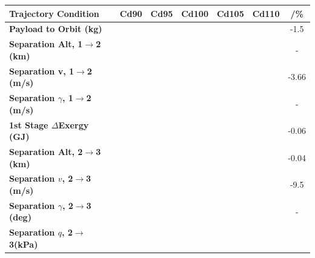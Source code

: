 \begin{table}[ht]
	\centering
\begin{tabular}{l c c c c c c} 
	\hline \textbf{Trajectory Condition}
	&Cd90
	&Cd95
	&Cd100
	&Cd105
	&Cd110
	& /\%
	\\
	\hline \textbf{Payload to Orbit (kg)}
	& \PayloadToOrbitCdNinety
	& \PayloadToOrbitCdNinetyFive
	& \PayloadToOrbitCdStandard
	& \PayloadToOrbitCdOneHundredFive
	& \PayloadToOrbitCdOneHundredTen
	&-1.5
	\\
	\textbf{Separation Alt, 1$\rightarrow$2 (km)}
	& \firstsecondSeparationAltCdNinety
	& \firstsecondSeparationAltCdNinetyFive
	& \firstsecondSeparationAltCdStandard
	& \firstsecondSeparationAltCdOneHundredFive
	& \firstsecondSeparationAltCdOneHundredTen
	& -
	\\
	\textbf{Separation v, 1$\rightarrow$2 (m/s)}
	& \firstsecondSeparationvCdNinety
	& \firstsecondSeparationvCdNinetyFive
	& \firstsecondSeparationvCdStandard
	& \firstsecondSeparationvCdOneHundredFive
	& \firstsecondSeparationvCdOneHundredTen
	&-3.66
	\\
	\textbf{Separation $\gamma$, 1$\rightarrow$2 (m/s)}
	& \firstsecondSeparationgammaCdNinety
	& \firstsecondSeparationgammaCdNinetyFive
	& \firstsecondSeparationgammaCdStandard
	& \firstsecondSeparationgammaCdOneHundredFive
	& \firstsecondSeparationgammaCdOneHundredTen
	& -
	\\
	\textbf{1st Stage $\Delta$Exergy (GJ)}
	& \firstdExergyCdNinety
	& \firstdExergyCdNinetyFive
	& \firstdExergyCdStandard
	& \firstdExergyCdOneHundredFive
	& \firstdExergyCdOneHundredTen
	&-0.06
	\\
	\textbf{Separation Alt, 2$\rightarrow$3 (km)}
	& \secondthirdSeparationAltCdNinety
	& \secondthirdSeparationAltCdNinetyFive
	& \secondthirdSeparationAltCdStandard
	& \secondthirdSeparationAltCdOneHundredFive
	& \secondthirdSeparationAltCdOneHundredTen
	&-0.04
	\\
	\textbf{Separation $v$, 2$\rightarrow$3 (m/s)}
	& \secondthirdSeparationvCdNinety
	& \secondthirdSeparationvCdNinetyFive
	& \secondthirdSeparationvCdStandard
	& \secondthirdSeparationvCdOneHundredFive
	& \secondthirdSeparationvCdOneHundredTen
	&-9.5
	\\
	\textbf{Separation $\gamma$, 2$\rightarrow$3 (deg)}
	& \secondthirdSeparationgammaCdNinety
	& \secondthirdSeparationgammaCdNinetyFive
	& \secondthirdSeparationgammaCdStandard
	& \secondthirdSeparationgammaCdOneHundredFive
	& \secondthirdSeparationgammaCdOneHundredTen
	& -
	\\
	\textbf{Separation $q$, 2$\rightarrow$3(kPa)}

\end{tabular}
\end{table}
